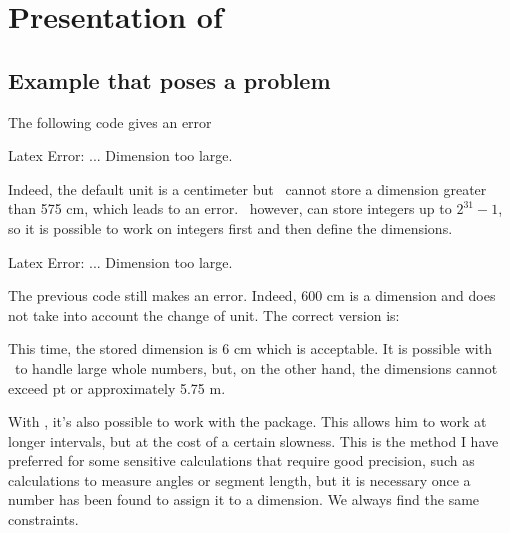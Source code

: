 \section{Presentation of }

\subsection{Example that poses a problem  }

The following code gives an error

\begin{tkzltxexample}[right margin=7cm]
\end{tkzltxexample}
 {\color{red} Latex Error: ... Dimension too large.}

Indeed, the default unit is a centimeter but \TEX\ cannot store a dimension greater than 575 cm, which leads to an error. \TEX\ however, can store integers up to $2^{31}-1$, so it is possible to work on integers first and then define the dimensions.

\begin{tkzltxexample}[right margin=7cm]
\end{tkzltxexample}

{\color{red} Latex Error: ... Dimension too large.}

The previous code still makes an error. Indeed, 600 cm is a dimension
 and does not take into account the change of unit. The correct version is:

\begin{tkzltxexample}[right margin=7cm]
\end{tkzltxexample}

This time, the stored dimension is 6 cm which is acceptable. It is possible with \TEX\ to handle large whole numbers, but, on the other hand, the dimensions cannot exceed  pt or approximately 5.75 m.

With \TEX, it's also possible to work with the  package. This allows him to work at longer intervals, but at the cost of a certain slowness. This is the method I have preferred for some sensitive calculations that require good precision, such as calculations to measure angles or segment length, but it is necessary once a number has been found to assign it to a dimension. We always find the same constraints.

